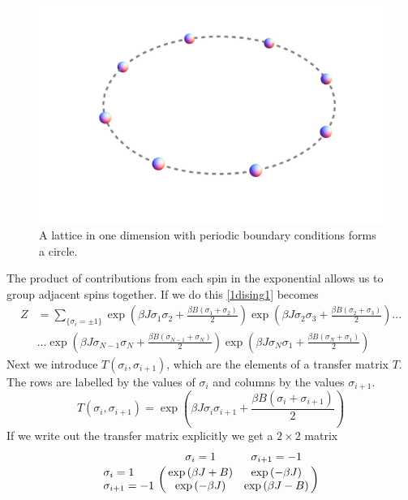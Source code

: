 %
\begin{figure}[bp]
\centering \includegraphics[scale=0.2]{Graphics/TransferMatrix/lattice_1d_closed.png}
\caption{A lattice in one dimension with periodic boundary conditions forms a circle.}
\label{fig:1dlatticeclosed} 
\end{figure}
%
The product of contributions from each spin in the exponential allows us to group adjacent spins together. If we do  this \eqref{1dising1} becomes \cite{Yeomans1992}
%
\begin{align}\label{1disingbeforematrixform}
Z&=\sum_{\{\sigma_{i}=\pm1\}}\exp\left(\beta J\sigma_{1}\sigma_{2}+\frac{\beta B\left(\sigma_{1}+\sigma_{2}\right)}{2}\right)\exp\left(\beta J\sigma_{2}\sigma_{3}+\frac{\beta B\left(\sigma_{2}+\sigma_{3}\right)}{2}\right)...\\
&...\exp\left(\beta J\sigma_{N-1}\sigma_{N}+\frac{\beta B\left(\sigma_{N-1}+\sigma_{N}\right)}{2}\right)\exp\left(\beta J\sigma_{N}\sigma_{1}+\frac{\beta B\left(\sigma_{N}+\sigma_{1}\right)}{2}\right)\nonumber
\end{align}
%
Next we introduce $T\left(\sigma_{i},\sigma_{i+1}\right)$,  which are the elements of a transfer matrix $T$. The rows are labelled by the values of $\sigma_{i}$ and columns by the values $\sigma_{i+1}$.
%
\begin{equation}\label{1disingtransfermatrix}
T\left(\sigma_{i},\sigma_{i+1}\right)=\exp\left(\beta J\sigma_{i}\sigma_{i+1}+\frac{\beta B\left(\sigma_{i}+\sigma_{i+1}\right)}{2}\right)
\end{equation}
%
If we write out the transfer matrix explicitly we get a $2 \times 2$ matrix
%
\begin{equation}
\bordermatrix{&\sigma_{i}=1&\sigma_{i+1}=-1 \cr
\sigma_{i}=1 & \exp\left(\beta J+B\right) & \exp\left(-\beta J \right) \cr
\sigma_{i+1}=-1 & \exp\left(-\beta J \right) & \exp\left(\beta J-B\right) \cr }
\end{equation}

